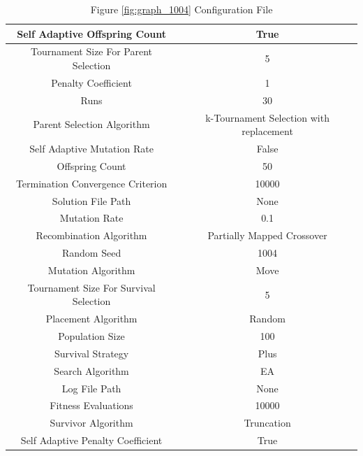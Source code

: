 \documentclass{standalone}
\begin{document}
\begin{table}[!htb]
	\centering
	\caption{Figure \ref{fig:graph_1004} Configuration File}
	\label{tab:graph_1004}
	\begin{tabular}{| c | c |}
		\hline
		Self Adaptive Offspring Count		& True		 \\
		\hline
		Tournament Size For Parent Selection		& 5		 \\
		\hline
		Penalty Coefficient		& 1		 \\
		\hline
		Runs		& 30		 \\
		\hline
		Parent Selection Algorithm		& k-Tournament Selection with replacement		 \\
		\hline
		Self Adaptive Mutation Rate		& False		 \\
		\hline
		Offspring Count		& 50		 \\
		\hline
		Termination Convergence Criterion		& 10000		 \\
		\hline
		Solution File Path		& None		 \\
		\hline
		Mutation Rate		& 0.1		 \\
		\hline
		Recombination Algorithm		& Partially Mapped Crossover		 \\
		\hline
		Random Seed		& 1004		 \\
		\hline
		Mutation Algorithm		& Move		 \\
		\hline
		Tournament Size For Survival Selection		& 5		 \\
		\hline
		Placement Algorithm		& Random		 \\
		\hline
		Population Size		& 100		 \\
		\hline
		Survival Strategy		& Plus		 \\
		\hline
		Search Algorithm		& EA		 \\
		\hline
		Log File Path		& None		 \\
		\hline
		Fitness Evaluations		& 10000		 \\
		\hline
		Survivor Algorithm		& Truncation		 \\
		\hline
		Self Adaptive Penalty Coefficient		& True		 \\
		\hline
	\end{tabular}
\end{table}
\end{document}
